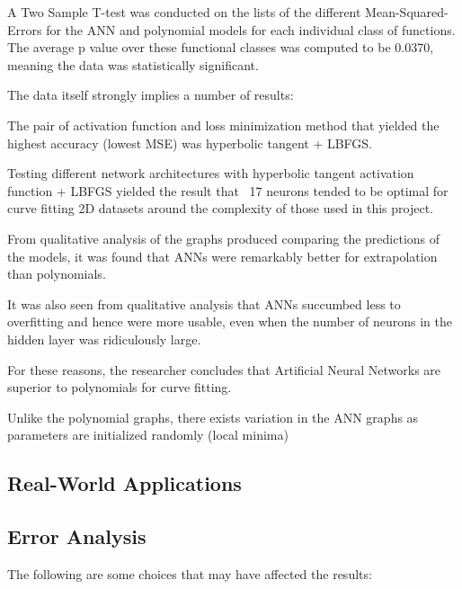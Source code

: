 \documentclass{article}
\begin{document}
    A Two Sample T-test was conducted on the lists of the different Mean-Squared-Errors for the ANN and polynomial models for each individual class of functions. The average p value over these functional classes was computed to be 0.0370, meaning the data was statistically significant.

    The data itself strongly implies a number of results:

    The pair of activation function and loss minimization method that yielded the highest accuracy (lowest MSE) was hyperbolic tangent + LBFGS.

    Testing different network architectures with hyperbolic tangent activation function + LBFGS yielded the result that ~17 neurons tended to be optimal for curve fitting 2D datasets around the complexity of those used in this project.

    From qualitative analysis of the graphs produced comparing the predictions of the models, it was found that ANNs were remarkably better for extrapolation than polynomials.

    It was also seen from qualitative analysis that ANNs succumbed less to overfitting and hence were more usable, even when the number of neurons in the hidden layer was ridiculously large.

    For these reasons, the researcher concludes that Artificial Neural Networks are superior to polynomials for curve fitting.


    Unlike the polynomial graphs, there exists variation in the ANN graphs as parameters are initialized randomly (local minima)

    \subsection{Real-World Applications}

    \subsection{Error Analysis}

    The following are some choices that may have affected the results:
\end{document}
